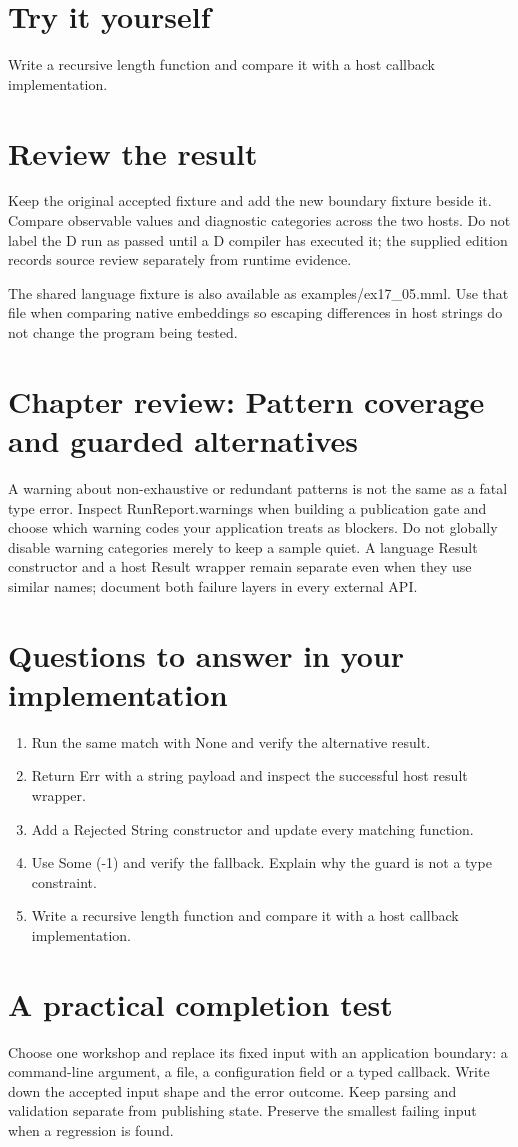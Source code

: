 \section*{Try it yourself}
Write a recursive length function and compare it with a host callback implementation.

\section*{Review the result}
Keep the original accepted fixture and add the new boundary fixture beside it. Compare observable values and diagnostic categories across the two hosts. Do not label the D run as passed until a D compiler has executed it; the supplied edition records source review separately from runtime evidence.

The shared language fixture is also available as examples/ex17\_05.mml. Use that file when comparing native embeddings so escaping differences in host strings do not change the program being tested.

\clearpage
\section*{Chapter review: Pattern coverage and guarded alternatives}
A warning about non-exhaustive or redundant patterns is not the same as a fatal type error. Inspect RunReport.warnings when building a publication gate and choose which warning codes your application treats as blockers. Do not globally disable warning categories merely to keep a sample quiet. A language Result constructor and a host Result wrapper remain separate even when they use similar names; document both failure layers in every external API.

\section*{Questions to answer in your implementation}
\begin{enumerate}
\item Run the same match with None and verify the alternative result.
\item Return Err with a string payload and inspect the successful host result wrapper.
\item Add a Rejected String constructor and update every matching function.
\item Use Some (-1) and verify the fallback. Explain why the guard is not a type constraint.
\item Write a recursive length function and compare it with a host callback implementation.
\end{enumerate}
\section*{A practical completion test}
Choose one workshop and replace its fixed input with an application boundary: a command-line argument, a file, a configuration field or a typed callback. Write down the accepted input shape and the error outcome. Keep parsing and validation separate from publishing state. Preserve the smallest failing input when a regression is found.

